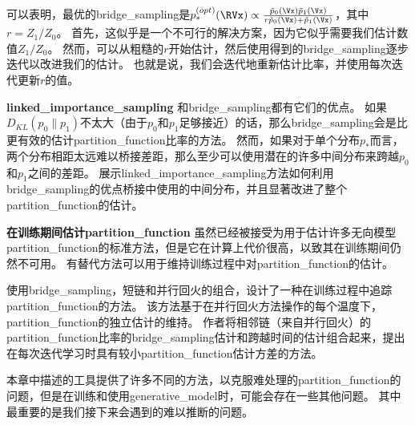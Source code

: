 可以表明，最优的\gls{bridge_sampling}是$p_*^{(opt)} (\RVx) \propto \frac{ \tilde{p}_0(\Vx) \tilde{p}_1(\Vx) }{ r\tilde{p}_0(\Vx) + \tilde{p}_1(\Vx) }$，其中$r = Z_1 / Z_0$。
首先，这似乎是一个不可行的解决方案，因为它似乎需要我们估计数值$Z_1 / Z_0$。
然而，可以从粗糙的$r$开始估计，然后使用得到的\gls{bridge_sampling}逐步迭代以改进我们的估计\citep{Neal05estimatingratios}。
也就是说，我们会迭代地重新估计比率，并使用每次迭代更新$r$的值。


\textbf{\gls{linked_importance_sampling}}
和\gls{bridge_sampling}都有它们的优点。
如果$D_{KL}(p_0 \| p_1)$不太大（由于$p_0$和$p_1$足够接近）的话，那么\gls{bridge_sampling}会是比更有效的估计\gls{partition_function}比率的方法。
然而，如果对于单个分布$p_*$而言，两个分布相距太远难以桥接差距，那么至少可以使用潜在的许多中间分布来跨越$p_0$和$p_1$之间的差距。
\cite{Neal05estimatingratios}展示\gls{linked_importance_sampling}方法如何利用\gls{bridge_sampling}的优点桥接中使用的中间分布，并且显著改进了整个\gls{partition_function}的估计。


\textbf{在训练期间估计\gls{partition_function}}
虽然已经被接受为用于估计许多无向模型\gls{partition_function}的标准方法，但是它在计算上代价很高，以致其在训练期间仍然不可用。
有替代方法可以用于维持训练过程中对\gls{partition_function}的估计。


使用\gls{bridge_sampling}，短链和并行回火的组合，\cite{Desjardins+al-NIPS2011}设计了一种在训练过程中追踪\gls{partition_function}的方法。
该方法基于在并行回火方法操作的每个温度下，\gls{partition_function}的独立估计的维持。
作者将相邻链（来自并行回火）的\gls{partition_function}比率的\gls{bridge_sampling}估计和跨越时间的估计组合起来，提出在每次迭代学习时具有较小\gls{partition_function}估计方差的方法。


本章中描述的工具提供了许多不同的方法，以克服难处理的\gls{partition_function}的问题，但是在训练和使用\gls{generative_model}时，可能会存在一些其他问题。
其中最重要的是我们接下来会遇到的难以推断的问题。

